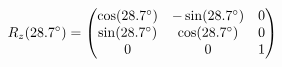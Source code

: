 \documentclass[preview]{standalone}
\begin{document}
\begin{align*}
\special{dvisvgm:raw <g id='unique000'>}R_z(28.7^\circ) = \begin{pmatrix} \cos(28.7^\circ) & -\sin(28.7^\circ) & 0 \\ \sin(28.7^\circ) & \cos(28.7^\circ) & 0 \\ 0 & 0 & 1 \end{pmatrix}\special{dvisvgm:raw </g>}
\end{align*}
\end{document}
